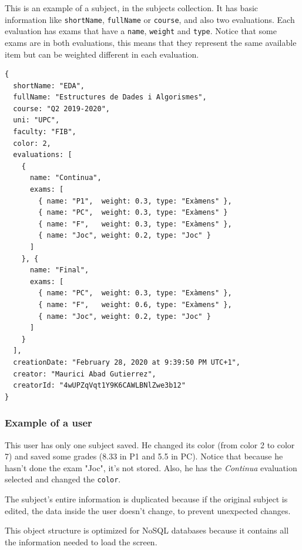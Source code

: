 This is an example of a subject, in the subjects collection. It has basic information like \texttt{shortName}, \texttt{fullName} or \texttt{course}, and also two evaluations. Each evaluation has exams that have a \texttt{name}, \texttt{weight} and \texttt{type}. Notice that some exams are in both evaluations, this means that they represent the same available item but can be weighted different in each evaluation.

\vfill
\begin{verbatim}
{
  shortName: "EDA",
  fullName: "Estructures de Dades i Algorismes",
  course: "Q2 2019-2020",
  uni: "UPC",
  faculty: "FIB",
  color: 2,
  evaluations: [
    {
      name: "Continua",
      exams: [
        { name: "P1",  weight: 0.3, type: "Exàmens" },
        { name: "PC",  weight: 0.3, type: "Exàmens" }
        { name: "F",   weight: 0.3, type: "Exàmens" },
        { name: "Joc", weight: 0.2, type: "Joc" }
      ]
    }, {
      name: "Final",
      exams: [
        { name: "PC",  weight: 0.3, type: "Exàmens" },
        { name: "F",   weight: 0.6, type: "Exàmens" },
        { name: "Joc", weight: 0.2, type: "Joc" }
      ]
    }
  ],
  creationDate: "February 28, 2020 at 9:39:50 PM UTC+1",
  creator: "Maurici Abad Gutierrez",
  creatorId: "4wUPZqVqt1Y9K6CAWLBNlZwe3b12"
}
\end{verbatim}
\vfill

\newpage
\subsubsection{Example of a user}
This user has only one subject saved. He changed its color (from color 2 to color 7) and saved some grades (8.33 in P1 and 5.5 in PC). Notice that because he hasn't done the exam "Joc", it's not stored. Also, he has the \textit{Continua} evaluation selected and changed the \texttt{color}. 

The subject's entire information is duplicated because if the original subject is edited, the data inside the user doesn't change, to prevent unexpected changes.

This object structure is optimized for NoSQL databases because it contains all the information needed to load the screen.

